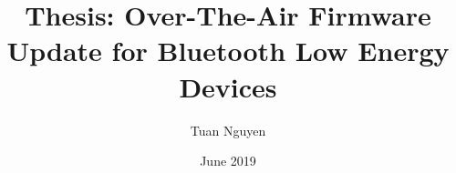 \documentclass[11pt,a4paper]{article}
\begin{document}
\title{Thesis: Over-The-Air Firmware Update for Bluetooth Low Energy Devices}
\author{Tuan Nguyen}
\date{June 2019}
\maketitle
\newpage

\tableofcontents
\newpage












\newpage


\end{document}

